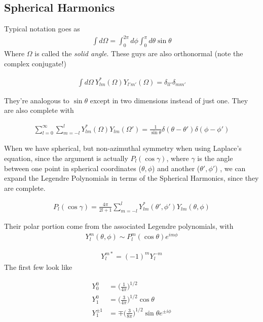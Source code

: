 \subsection{Spherical Harmonics}


Typical notation goes as 
\begin{align}
\int d\Omega = \int_0^{2\pi} d\phi \int_0^\pi d\theta \sin\theta
\end{align}
Where $\Omega$ is called the \emph{solid angle}. These guys are also orthonormal (note the complex conjugate!)

\begin{align}
\int d\Omega~Y^*_{lm}(\Omega)Y_{l'm'}(\Omega) = \delta_{ll'}\delta_{mm'}
\end{align}

They're analogous to $\sin\theta$  except in two dimensions instead of just one. They are also complete with

\begin{align}
\sum_{l=0}^\infty \sum_{m=-l}^l Y^*_{lm}(\Omega)Y_{lm}(\Omega') = \frac{1}{\sin\theta}\delta(\theta-\theta')\delta(\phi-\phi')
\end{align}

When we have spherical, but non-azimuthal symmetry when using Laplace's equation, since the argument is actually $P_l(\cos\gamma)$, where $\gamma$ is the angle between one point in spherical coordinates ($\theta,\phi$) and another ($\theta',\phi'$) , we can expand the Legendre Polynomials in terms of the Spherical Harmonics, since they are complete.

\begin{align}
P_l(\cos\gamma) = \frac{4\pi}{2l+1}\sum_{m=-l}^l Y_{lm}^*(\theta', \phi')Y_{lm}(\theta,\phi)
\end{align}


Their polar portion come from the associated Legendre polynomials, with
\begin{align}
Y^m_l(\theta,\phi) \sim P_l^m(\cos\theta)e^{im\phi}
\end{align}


\begin{align}
Y^{m*}_{l}= (-1)^mY^{-m}_l
\end{align}
The first few look like

\begin{align}
Y_0^0 &= \Big(\frac{1}{4\pi}\Big)^{1/2}\\
Y_1^0 &= \Big(\frac{3}{4\pi}\Big)^{1/2}\cos\theta\\
Y_1^{\pm 1} &= \mp \Big(\frac{3}{8\pi}\Big)^{1/2}\sin\theta e^{\pm i\phi}
\end{align}

